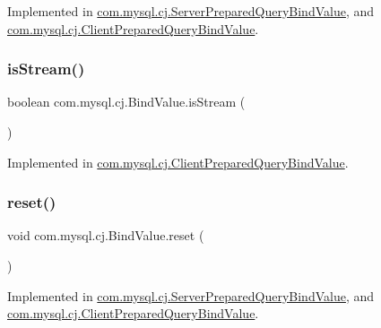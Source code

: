 Implemented in \mbox{\hyperlink{classcom_1_1mysql_1_1cj_1_1_server_prepared_query_bind_value_a53324f0183c3d2b6d99247114a32b60c}{com.\+mysql.\+cj.\+Server\+Prepared\+Query\+Bind\+Value}}, and \mbox{\hyperlink{classcom_1_1mysql_1_1cj_1_1_client_prepared_query_bind_value_af2831a168b2afe1d429903340c13af2f}{com.\+mysql.\+cj.\+Client\+Prepared\+Query\+Bind\+Value}}.

\mbox{\label{interfacecom_1_1mysql_1_1cj_1_1_bind_value_ab00e3f54fd1417769cb9ae5ea54c0983}} 
\subsubsection{\texorpdfstring{is\+Stream()}{isStream()}}
{\footnotesize\ttfamily boolean com.\+mysql.\+cj.\+Bind\+Value.\+is\+Stream (\begin{DoxyParamCaption}{ }\end{DoxyParamCaption})}



Implemented in \mbox{\hyperlink{classcom_1_1mysql_1_1cj_1_1_client_prepared_query_bind_value_a624753143b95fbec245f37b73d41710f}{com.\+mysql.\+cj.\+Client\+Prepared\+Query\+Bind\+Value}}.

\mbox{\label{interfacecom_1_1mysql_1_1cj_1_1_bind_value_aeff59ff50904893a11b96f2ff560f974}} 
\subsubsection{\texorpdfstring{reset()}{reset()}}
{\footnotesize\ttfamily void com.\+mysql.\+cj.\+Bind\+Value.\+reset (\begin{DoxyParamCaption}{ }\end{DoxyParamCaption})}



Implemented in \mbox{\hyperlink{classcom_1_1mysql_1_1cj_1_1_server_prepared_query_bind_value_ace2cd66fa5ce7b60d1ddb0c919ec5783}{com.\+mysql.\+cj.\+Server\+Prepared\+Query\+Bind\+Value}}, and \mbox{\hyperlink{classcom_1_1mysql_1_1cj_1_1_client_prepared_query_bind_value_aac106a5094f15af61d1921bf89af5668}{com.\+mysql.\+cj.\+Client\+Prepared\+Query\+Bind\+Value}}.

